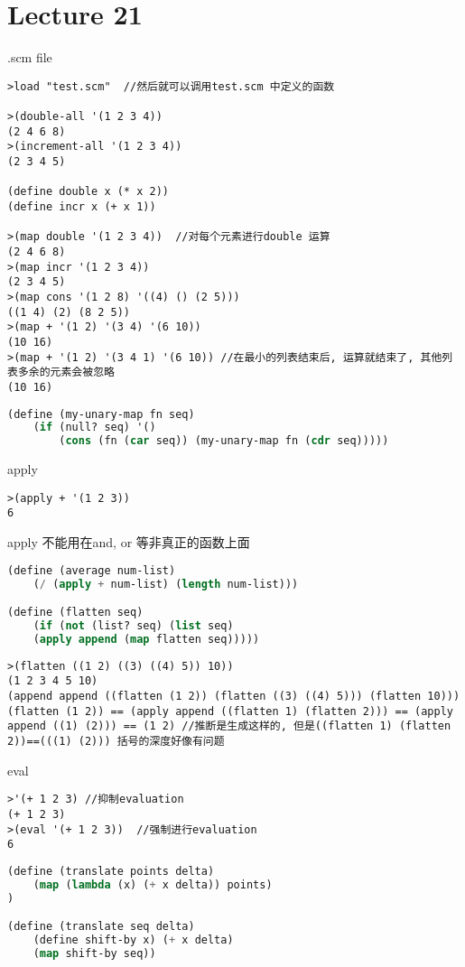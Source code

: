 \documentclass{article}
\begin{document}
\section{Lecture 21}
.scm file
\begin{verbatim}
>load "test.scm"  //然后就可以调用test.scm 中定义的函数

>(double-all '(1 2 3 4))
(2 4 6 8)
>(increment-all '(1 2 3 4))
(2 3 4 5)

(define double x (* x 2))
(define incr x (+ x 1))

>(map double '(1 2 3 4))  //对每个元素进行double 运算
(2 4 6 8)
>(map incr '(1 2 3 4))
(2 3 4 5)
>(map cons '(1 2 8) '((4) () (2 5)))
((1 4) (2) (8 2 5))
>(map + '(1 2) '(3 4) '(6 10))
(10 16)
>(map + '(1 2) '(3 4 1) '(6 10)) //在最小的列表结束后, 运算就结束了, 其他列表多余的元素会被忽略
(10 16)
\end{verbatim}

\begin{lstlisting}[language = Lisp]
(define (my-unary-map fn seq)
	(if (null? seq) '()
		(cons (fn (car seq)) (my-unary-map fn (cdr seq)))))
\end{lstlisting}

apply
\begin{verbatim}
>(apply + '(1 2 3))
6
\end{verbatim}apply 不能用在and, or 等非真正的函数上面

\begin{lstlisting}[language = Lisp]
(define (average num-list)
	(/ (apply + num-list) (length num-list)))

(define (flatten seq)
	(if (not (list? seq) (list seq)
	(apply append (map flatten seq)))))
\end{lstlisting}

\begin{verbatim}
>(flatten ((1 2) ((3) ((4) 5)) 10))
(1 2 3 4 5 10)
(append append ((flatten (1 2)) (flatten ((3) ((4) 5))) (flatten 10)))
(flatten (1 2)) == (apply append ((flatten 1) (flatten 2))) == (apply append ((1) (2))) == (1 2) //推断是生成这样的, 但是((flatten 1) (flatten 2))==(((1) (2))) 括号的深度好像有问题
\end{verbatim}

eval
\begin{verbatim}
>'(+ 1 2 3) //抑制evaluation
(+ 1 2 3)
>(eval '(+ 1 2 3))  //强制进行evaluation
6
\end{verbatim}

\begin{lstlisting}[language = Lisp]
(define (translate points delta)
	(map (lambda (x) (+ x delta)) points) 
)

(define (translate seq delta)
	(define shift-by x) (+ x delta)
	(map shift-by seq))
\end{lstlisting}
\end{document}
